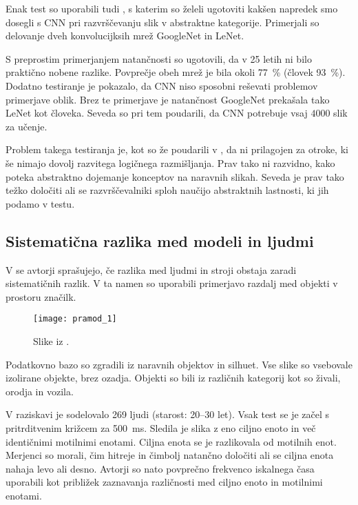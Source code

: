 Enak test so uporabili tudi , s katerim so želeli ugotoviti kakšen napredek smo dosegli s CNN pri razvrščevanju slik v abstraktne kategorije. Primerjali so delovanje dveh konvolucijksih mrež GoogleNet in LeNet.  

S preprostim primerjanjem natančnosti so ugotovili, da v 25 letih ni bilo praktično nobene razlike. Povprečje obeh mrež je bila okoli \SI{77}{\%} (človek \SI{93}{\%}). Dodatno testiranje je pokazalo, da CNN niso sposobni reševati problemov primerjave oblik. Brez te primerjave je natančnost GoogleNet prekašala tako LeNet kot človeka. Seveda so pri tem poudarili, da CNN potrebuje vsaj $4000$ slik za učenje. 

Problem takega testiranja je, kot so že poudarili v \cite{fleuret2011comparing}, da ni prilagojen za otroke, ki še nimajo dovolj razvitega logičnega razmišljanja. Prav tako ni razvidno, kako poteka abstraktno dojemanje konceptov na naravnih slikah. Seveda je prav tako težko določiti ali se razvrščevalniki sploh naučijo abstraktnih lastnosti, ki jih podamo v testu.

\subsection{Sistematična razlika med modeli in ljudmi}
V \cite{pramod2016computational} se avtorji sprašujejo, če razlika med ljudmi in stroji obstaja zaradi sistematičnih razlik. V ta namen so uporabili primerjavo razdalj med objekti v prostoru značilk. 

\begin{figure}[!htbp]
	\centering
	\texttt{[image: pramod\_1]}
	\caption{Slike iz \cite{pramod2016computational}.}
\end{figure}


Podatkovno bazo so zgradili iz naravnih objektov in silhuet. Vse slike so vsebovale izolirane objekte, brez ozadja. Objekti so bili iz različnih kategorij kot so živali, orodja in vozila. 

V raziskavi je sodelovalo 269 ljudi (starost: 20--30 let). Vsak test se je začel s pritrditvenim križcem za \SI{500}{\ms}. Sledila je slika z eno ciljno enoto in več identičnimi motilnimi enotami. Ciljna enota se je razlikovala od motilnih enot. Merjenci so morali, čim hitreje in čimbolj natančno določiti ali se ciljna enota nahaja levo ali desno. Avtorji so nato povprečno frekvenco iskalnega časa uporabili kot približek zaznavanja različnosti med ciljno enoto in motilnimi enotami.

